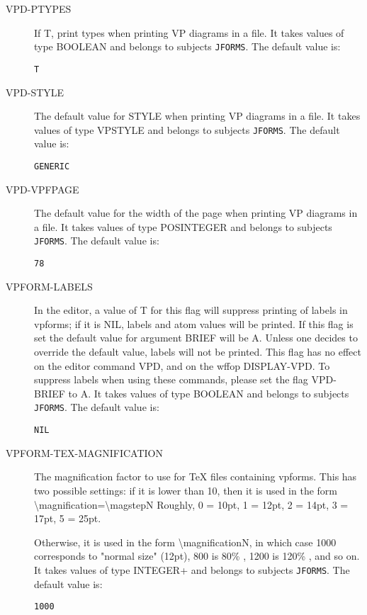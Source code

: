 \begin{description}
\item[VPD-PTYPES]  
If T, print types when printing VP diagrams in a file.
It takes values of type BOOLEAN and belongs to subjects \texttt{JFORMS}.  The default value is: \begin{lstlisting}
T
\end{lstlisting}

\item[VPD-STYLE]  
The default value for STYLE when printing VP diagrams in a file.
It takes values of type VPSTYLE and belongs to subjects \texttt{JFORMS}.  The default value is: \begin{lstlisting}
GENERIC
\end{lstlisting}

\item[VPD-VPFPAGE]  
The default value for the width of the page when printing VP diagrams in a file.
It takes values of type POSINTEGER and belongs to subjects \texttt{JFORMS}.  The default value is: \begin{lstlisting}
78
\end{lstlisting}

\item[VPFORM-LABELS]  
In the editor, a value of T for this flag will suppress
printing of labels in vpforms; if it is NIL, labels and atom values
will be printed.
If this flag is set the default value for argument BRIEF will
be A. Unless one decides to override the default value, labels will not be
printed.  This flag has no effect on the editor command VPD, and on the
wffop DISPLAY-VPD.  To suppress labels when using these commands, please
set the flag VPD-BRIEF to A.
It takes values of type BOOLEAN and belongs to subjects \texttt{JFORMS}.  The default value is: \begin{lstlisting}
NIL
\end{lstlisting}

\item[VPFORM-TEX-MAGNIFICATION]  
The magnification factor to use for TeX files containing vpforms.
This has two possible settings: if it is lower than 10, then it is used
in the form \textbackslash magnification=\textbackslash magstepN
Roughly, 0 = 10pt, 1 = 12pt, 2 = 14pt, 3 = 17pt, 5 = 25pt.

Otherwise, it is used in the form \textbackslash magnificationN, in which case 
1000 corresponds to "normal size" (12pt), 800 is 80\% , 1200 is 120\% , and
so on.
It takes values of type INTEGER+ and belongs to subjects \texttt{JFORMS}.  The default value is: \begin{lstlisting}
1000
\end{lstlisting}


\end{description}
